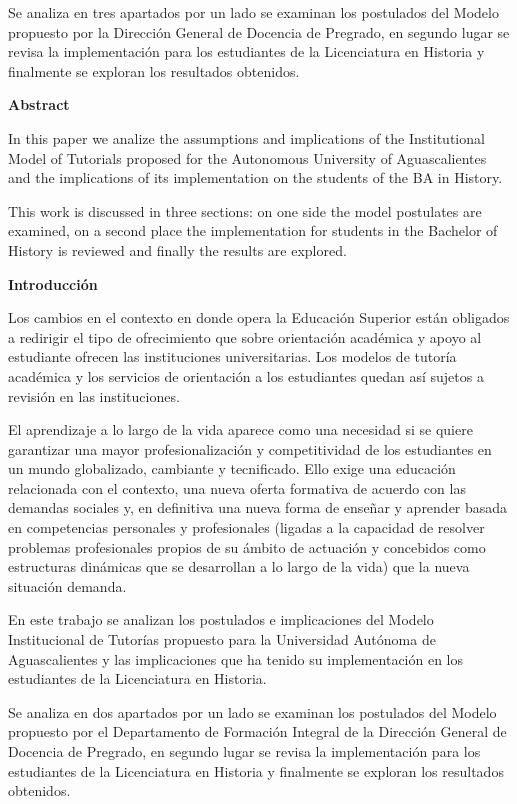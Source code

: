 Se analiza en tres apartados por un lado se examinan los postulados del
Modelo propuesto por la Dirección General de Docencia de Pregrado, en
segundo lugar se revisa la implementación  para los estudiantes de la
Licenciatura en Historia y finalmente se exploran los resultados obtenidos.

\medskip
{\bfseries Abstract}

In this paper we analize the assumptions and implications of the
Institutional Model  of Tutorials proposed for the Autonomous University of
Aguascalientes and the implications of its implementation on the students
of the BA in History.

This work is discussed in three sections: on one side the model postulates
are examined, on a second place the implementation for students in the
Bachelor of History is reviewed and finally the results are explored.


\medskip
{\bfseries Introducción}

Los cambios en el contexto en donde opera la Educación Superior están
obligados a redirigir el tipo de ofrecimiento que sobre orientación
académica y apoyo al estudiante ofrecen las instituciones universitarias.
Los modelos de tutoría académica y los servicios de orientación a los
estudiantes quedan así sujetos a revisión en las instituciones.

El aprendizaje a lo largo de la vida aparece como una necesidad si se quiere
garantizar una mayor profesionalización y competitividad de los estudiantes
en un mundo globalizado, cambiante y tecnificado. Ello exige una educación
relacionada con el contexto, una nueva oferta formativa de acuerdo con las
demandas sociales y, en definitiva una nueva forma de enseñar y aprender
basada en competencias personales y profesionales (ligadas a la capacidad
de resolver problemas profesionales propios de su ámbito de actuación y
concebidos como estructuras dinámicas que se desarrollan a lo largo de la
vida) que la nueva situación demanda. 

En este trabajo se analizan los postulados e implicaciones del Modelo
Institucional de Tutorías propuesto para la Universidad Autónoma de
Aguascalientes  y las implicaciones que ha tenido su implementación en los
estudiantes de la Licenciatura en Historia.

Se analiza en dos apartados por un lado se examinan los postulados del
Modelo propuesto por el Departamento de Formación Integral de la Dirección
General de Docencia de Pregrado, en segundo lugar se revisa la
implementación para los estudiantes de la Licenciatura en Historia y
finalmente se exploran los resultados obtenidos. 
\newpage


